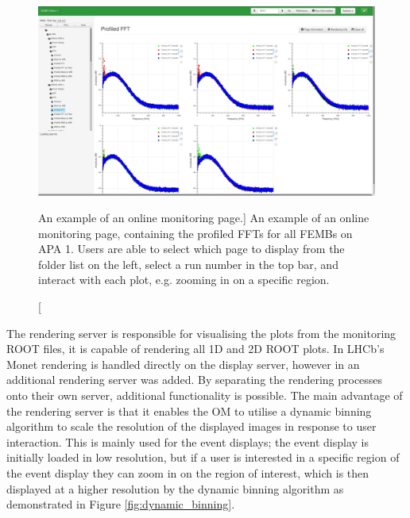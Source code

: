 \begin{figure}

	\centering

	\includegraphics[width=\textwidth]{figures/profiled_fft_monet.png}

	\caption
	[An example of an online monitoring page.] 
	{ An example of an online monitoring page, containing the profiled FFTs for
	all FEMBs on APA 1. Users are able to select which page to display from the
	folder list on the left, select a run number in the top bar, and interact 
	with each plot, e.g. zooming in on a specific region.} 
	\label{fig:monet_page}

\end{figure}

The rendering server is responsible for visualising the plots from the 
monitoring ROOT files, it is capable of rendering all 1D and 2D ROOT plots. In 
LHCb's Monet rendering is handled directly on the display server, however in 
\protodune{} an additional rendering server was added. By separating the 
rendering processes onto their own server, additional functionality is 
possible. The main advantage of the rendering server is that it enables the 
OM to utilise a dynamic binning algorithm to scale the resolution of the 
displayed images in response to user interaction. This is mainly used for the 
event displays; the event display is initially loaded in low resolution, but 
if a user is interested in a specific region of the event display they can 
zoom in on the region of interest, which is then displayed at a higher 
resolution by the dynamic binning algorithm as demonstrated in Figure 
\ref{fig:dynamic_binning}.

